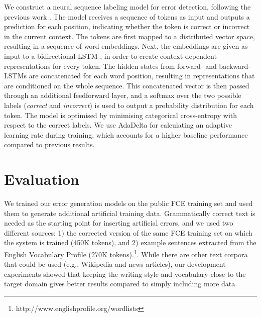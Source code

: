 \documentclass[11pt,letterpaper]{article}
\begin{document}
We construct a neural sequence labeling model for error detection, following the previous work \cite{Rei2016,Rei2017}. The model receives a sequence of tokens
as input and outputs a prediction for each position, indicating whether the token is correct or incorrect in the current context.
The tokens are first mapped to a distributed vector space, resulting in a sequence of word embeddings. Next, the embeddings are given as input to a bidirectional LSTM \cite{Hochreiter1997}, in order to create context-dependent representations for every token.
The  hidden states from forward- and backward-LSTMs are concatenated for each word position, resulting in representations that are conditioned on the whole sequence. This concatenated vector is then passed through an additional feedforward layer, and a softmax over the two possible labels (\textit{correct} and \textit{incorrect}) is used to output a probability distribution for each token.
The model is optimised by minimising categorical cross-entropy with respect to the correct labels.
We use AdaDelta \cite{Zeiler2012} for calculating an adaptive learning rate during training, which accounts for a higher baseline performance compared to previous results.


















\section{Evaluation}
\label{sec:evaluation}

We trained our error generation models on the public FCE training set \cite{Yannakoudakis2011} and used them to generate additional artificial training data.
Grammatically correct text is needed as the starting point for inserting artificial errors, and we used two different sources: 1) the corrected version of the same FCE training set on which the system is trained (450K tokens), and 2) example sentences extracted from the English Vocabulary Profile (270K tokens).\footnote{http://www.englishprofile.org/wordlists}. While there are other text corpora that could be used (e.g., Wikipedia and news articles), our development experiments showed that keeping the writing style and vocabulary close to the target domain gives better results compared to simply including more data. 
\end{document}
